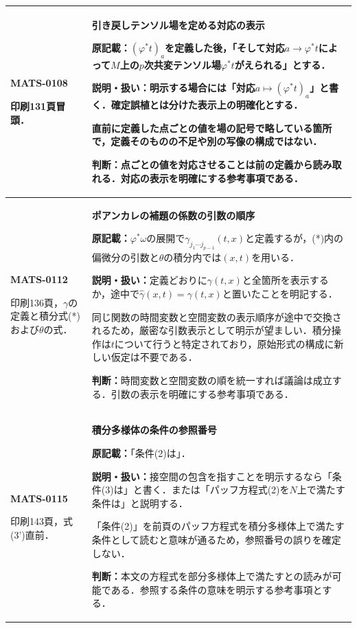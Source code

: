 \documentclass[a4paper,10pt]{ltjsarticle}
\begin{document}
\begin{longtable}{@{}>{\raggedright\arraybackslash}p{.19\linewidth}>{\raggedright\arraybackslash}p{.77\linewidth}@{}}
\hline
\hypertarget{MATS-0108}{}\textbf{MATS-0108}\par 印刷131頁冒頭． & \textbf{引き戻しテンソル場を定める対応の表示}\par\textbf{原記載：}$(\varphi^*t)_a$を定義した後，「そして対応$a\to\varphi^*t$によって$M$上の$p$次共変テンソル場$\varphi^*t$がえられる」とする．\par\textbf{説明・扱い：}明示する場合には「対応$a\mapsto(\varphi^*t)_a$」と書く．確定誤植とは分けた表示上の明確化とする．\par 直前に定義した点ごとの値を場の記号で略している箇所で，定義そのものの不足や別の写像の構成ではない．\par\textbf{判断：}点ごとの値を対応させることは前の定義から読み取れる．対応の表示を明確にする参考事項である． \\[3pt]
\hline
\hypertarget{MATS-0112}{}\textbf{MATS-0112}\par 印刷136頁，$\gamma$の定義と積分式(*)および$\theta$の式． & \textbf{ポアンカレの補題の係数の引数の順序}\par\textbf{原記載：}$\varphi^*\omega$の展開で$\gamma_{j_1\cdots j_{p-1}}(t,x)$と定義するが，(*)内の偏微分の引数と$\theta$の積分内では$(x,t)$を用いる．\par\textbf{説明・扱い：}定義どおりに$\gamma(t,x)$と全箇所を表示するか，途中で$\widehat\gamma(x,t)=\gamma(t,x)$と置いたことを明記する．\par 同じ関数の時間変数と空間変数の表示順序が途中で交換されるため，厳密な引数表示として明示が望ましい．積分操作は$t$について行うと特定されており，原始形式の構成に新しい仮定は不要である．\par\textbf{判断：}時間変数と空間変数の順を統一すれば議論は成立する．引数の表示を明確にする参考事項である． \\[3pt]
\hline
\hypertarget{MATS-0115}{}\textbf{MATS-0115}\par 印刷143頁，式(3')直前． & \textbf{積分多様体の条件の参照番号}\par\textbf{原記載：}「条件(2)は」．\par\textbf{説明・扱い：}接空間の包含を指すことを明示するなら「条件(3)は」と書く．または「パッフ方程式(2)を$N$上で満たす条件は」と説明する．\par 「条件(2)」を前頁のパッフ方程式を積分多様体上で満たす条件として読むと意味が通るため，参照番号の誤りを確定しない．\par\textbf{判断：}本文の方程式を部分多様体上で満たすとの読みが可能である．参照する条件の意味を明示する参考事項とする． \\[3pt]

\end{longtable}
\end{document}
